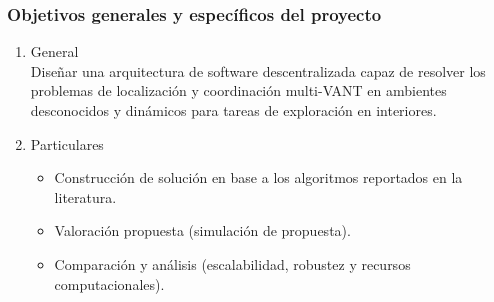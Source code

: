 \documentclass[
	12pt, %
	aspectratio=169, %
]{beamer}
\begin{document}
\begin{frame}
  
  \frametitle{Objetivos generales y específicos del proyecto}

  \begin{enumerate}
  \item<1-> General \\

    Diseñar una arquitectura de software descentralizada capaz de resolver los problemas de localización y coordinación multi-VANT en ambientes desconocidos y dinámicos para tareas de exploración en interiores.
        
  \item<2-> Particulares\\

    \begin{itemize}
    \item<1-> Construcción de solución en base a los algoritmos reportados en la literatura.
    \item<2-> Valoración propuesta (simulación de propuesta).
    \item<3-> Comparación y análisis (escalabilidad, robustez y recursos computacionales).
    \end{itemize}
    
  \end{enumerate}
\end{frame}

\end{document}
